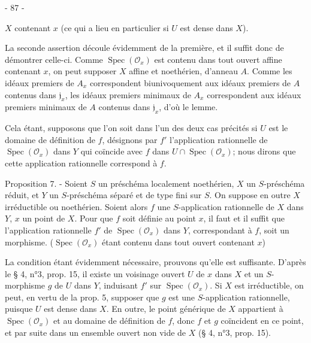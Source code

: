 \newpage


- 87 -

$X$ contenant $x$ (ce qui a lieu en particulier si $U$ est dense dans $X$).

La seconde assertion découle évidemment de la première, et il suffit donc de démontrer celle-ci. Comme $\operatorname{Spec}(\mathcal{O}_x)$ est contenu dans tout ouvert affine contenant $x$, on peut supposer $X$ affine et noethérien, d'anneau $A$. Comme les idéaux premiers de $A_x$ correspondent biunivoquement aux idéaux premiers de $A$ contenus dans $\mathfrak{j}_x$, les idéaux premiers minimaux de $A_x$ correspondent aux idéaux premiers minimaux de $A$ contenus dans $\mathfrak{j}_x$, d'où le lemme.

Cela étant, supposons que l'on soit dans l'un des deux cas précités si $U$ est le domaine de définition de $f$, désignons par $f'$ l'application rationnelle de $\operatorname{Spec}(\mathcal{O}_x)$ dans $Y$ qui coïncide avec $f$ dans $U \cap \operatorname{Spec}(\mathcal{O}_x)$; nous dirons que cette application rationnelle correspond à $f$.

Proposition 7. - Soient $S$ un préschéma localement noethérien, $X$ un $S$-préschéma réduit, et $Y$ un $S$-préschéma séparé et de type fini sur $S$. On suppose en outre $X$ irréductible ou noethérien. Soient alors $f$ une $S$-application rationnelle de $X$ dans $Y$, $x$ un point de $X$. Pour que $f$ soit définie au point $x$, il faut et il suffit que l'application rationnelle $f'$ de $\operatorname{Spec}(\mathcal{O}_x)$ dans $Y$, correspondant à $f$, soit un morphisme.
($\operatorname{Spec}(\mathcal{O}_x)$ étant contenu dans tout ouvert contenant $x$)

La condition étant évidemment nécessaire, prouvons qu'elle est suffisante. D'après le § 4, n°3, prop. 15, il existe un voisinage ouvert $U$ de $x$ dans $X$ et un $S$-morphisme $g$ de $U$ dans $Y$, induisant $f'$ sur $\operatorname{Spec}(\mathcal{O}_x)$. Si $X$ est irréductible, on peut, en vertu de la prop. 5, supposer que $g$ est une $S$-application rationnelle, puisque $U$ est dense dans $X$. En outre, le point générique de $X$ appartient à $\operatorname{Spec}(\mathcal{O}_x)$ et au domaine de définition de $f$, donc $f$ et $g$ coïncident en ce point, et par suite dans un ensemble ouvert non vide de $X$ (§ 4, n°3, prop. 15).

\newpage


